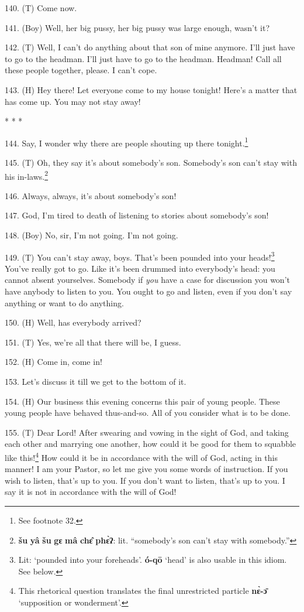 
140. (T) Come now.

141. (Boy) Well, her big pussy, her big pussy was large enough, wasn't it?

142. (T) Well, I can't do anything about that son of mine anymore. I'll just have
to go to the headman. I'll just have to go to the headman. Headman! Call all these
people together, please. I can't cope.

143. (H) Hey there! Let everyone come to my house tonight! Here's a matter that
has come up. You may not stay away!

\begin{center}
* * *
\end{center}

144. Say, I wonder why there are people shouting up there tonight.\footnote{See footnote 32.}

145. (T)  Oh, they say it's
about somebody's son. Somebody's son can't stay with his in-laws.\footnote{\textbf{šu} \textbf{yâ} \textbf{šu} \textbf{gɛ} \textbf{mâ} \textbf{chɛ̂} \textbf{phɛ̀ʔ}: lit. ``somebody's son can't stay with somebody.''}

146. Always, always, it's about somebody's son!

147. God, I'm tired to death of listening to stories about somebody's son!

148. (Boy) No, sir, I'm not going. I'm not going.

149. (T) You can't stay away, boys. That's been pounded into your heads!\footnote{Lit: `pounded into your foreheads'. \textbf{ó-qō} `head' is also usable in this idiom. See below.} You've
really got to go. Like it's been drummed into everybody's head: you cannot absent
yourselves. Somebody if \textit{you} have a case for discussion you won't have
anybody to listen to you. You ought to go and listen, even if you don't say anything
or want to do anything.

150. (H) Well, has everybody arrived?

151. (T) Yes, we're all that there will be, I guess.

152. (H) Come in, come in!

153. Let's discuss it till we get to the bottom of it.

154. (H) Our business this evening concerns this pair of young people. These young
people have behaved thus-and-so. All of you consider what is to be done.

155. (T)  Dear Lord! After swearing and vowing
in the sight of God, and taking each other and marrying one another, how could
it be good for them to squabble like this!\footnote{This rhetorical question translates the final unrestricted particle \textbf{nɛ̀-ɔ̄} `supposition or wonderment'.} How could it be in accordance with
the will of God, acting in this manner! I am your Pastor, so let me give you some
words of instruction. If you wish to listen, that's up to you. If you don't want
to listen, that's up to you. I say it is not in accordance with the will of God!

